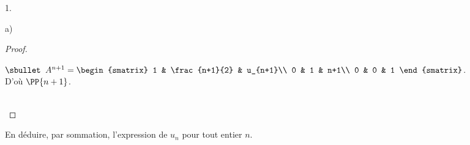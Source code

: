 \begin{noliste}{1.}
\begin{noliste}{a)}
\begin{proof}
\begin{noliste}{\fitem}
\begin{noliste}{$\sbullet$}
          $A^{n+1} =
          \begin{smatrix}
            1 & \frac{n+1}{2} & u_{n+1}\\
            0 & 1 & n+1\\
            0 & 0 & 1
          \end{smatrix}$.\\
          D'où $\PP{n+1}$.
        \end{noliste}        
      \end{noliste}
      ~\\[-1cm]
    \end{proof}


    \newpage


  \item En déduire, par sommation, l'expression de $u_{n}$ pour tout
    entier $n$.


\end{noliste}
\end{noliste}
